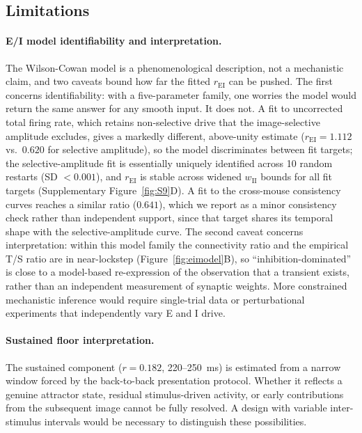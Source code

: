 \documentclass[11pt,onecolumn]{article}
\begin{document}
\subsection{Limitations}

\paragraph{E/I model identifiability and interpretation.}
The Wilson-Cowan model is a phenomenological description, not a
mechanistic claim, and two caveats bound how far the fitted
$r_\mathrm{EI}$ can be pushed.  The first concerns identifiability: with a
five-parameter family, one worries the model would return the same answer
for any smooth input.  It does not.  A fit to uncorrected total firing
rate, which retains non-selective drive that the image-selective
amplitude excludes, gives a markedly different, above-unity estimate
($r_\mathrm{EI} = 1.112$ vs.\ $0.620$ for selective amplitude), so the
model discriminates between fit targets; the selective-amplitude fit is
essentially uniquely identified across 10 random restarts (SD $< 0.001$),
and $r_\mathrm{EI}$ is stable across widened $w_\mathrm{II}$ bounds for
all fit targets (Supplementary Figure~\ref{fig:S9}D).  A fit to the
cross-mouse consistency curves reaches a similar ratio ($0.641$), which we
report as a minor consistency check rather than independent support, since
that target shares its temporal shape with the selective-amplitude curve.
The second caveat concerns interpretation: within this model family the
connectivity ratio and the empirical T/S ratio are in near-lockstep
(Figure~\ref{fig:eimodel}B), so ``inhibition-dominated'' is close to a
model-based re-expression of the observation that a transient exists,
rather than an independent measurement of synaptic weights.  More
constrained mechanistic inference would require single-trial data or
perturbational experiments that independently vary E and I drive.

\paragraph{Sustained floor interpretation.}
The sustained component ($r = 0.182$, 220--250~ms) is estimated from a
narrow window forced by the back-to-back presentation protocol.  Whether
it reflects a genuine attractor state, residual stimulus-driven activity,
or early contributions from the subsequent image cannot be fully resolved.
A design with variable inter-stimulus intervals would be necessary to
distinguish these possibilities.
\end{document}
